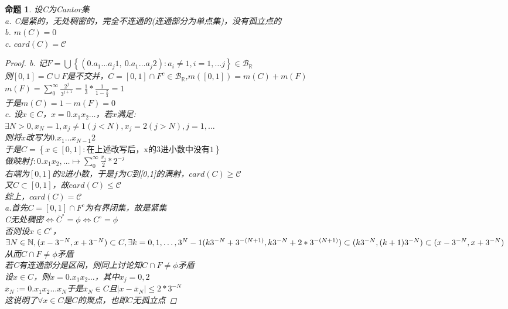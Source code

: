 \documentclass[12pt, a4paper, oneside]{ctexbook}
\newtheorem{proposition}[theorem]{命题}
\begin{document}
\begin{proposition}
    设C为Cantor集\\
    a. C是紧的，无处稠密的，完全不连通的(连通部分为单点集)，没有孤立点的\\
    b. $m(C)=0$\\
    c. $card(C)=\mathcal{C}$
    \begin{proof}
        b. 记$F=\bigcup\left\{(0.a_1\dots a_j1,\ 0.a_1\dots a_j2):a_i\neq 1,i=1,\dots j\right\}\in\mathcal{B}_{\mathbb{R}}$\\
        则$[0,1]=C\cup F$是不交并，$C=[0,1]\cap F^c\in\mathcal{B}_{\mathbb{R}}$,$m([0,1])=m(C)+m(F)$\\
        $m(F)=\sum_0^{\infty}\frac{2^j}{3^{j+1}}=\frac{1}{3}*\frac{1}{1-\frac{2}{3}}=1$\\
        于是$m(C)=1-m(F)=0$\\
        c. 设$x\in C$，$x=0.x_1x_2\dots$，若$x$满足:\\
        $\exists N>0,x_N=1,x_j\neq 1(j<N),x_j=2(j>N),j=1,\dots$\\
        则将$x$改写为$0.x_1\dots x_{N-1}2$\\
        于是$C=\left\{x\in[0,1]:\text{在上述改写后，x的3进小数中没有1}\right\}$\\
        做映射$f:0.x_1x_2,\dots\mapsto \sum_0^{\infty}\frac{x_j}{2}*2^{-j}$\\
        右端为$[0,1]$的2进小数，于是$f$为C到[0,1]的满射，$card(C)\geq \mathcal{C}$\\
        又$C\subset[0,1]$，故$card(C)\leq\mathcal{C}$\\
        综上，$card(C)=\mathcal{C}$\\
        a.首先$C=[0,1]\cap F^c$为有界闭集，故是紧集\\
        C无处稠密$\Leftrightarrow \overline{C}^{\circ}=\phi\Leftrightarrow C^{\circ}=\phi$\\
        否则设$x\in C^{\circ}$，$\exists N\in\mathbb{N},(x-3^{-N},x+3^{-N})\subset C,\exists k=0,1,\dots,3^N-1\\
        (k3^{-N}+3^{-(N+1)},k3^{-N}+2*3^{-(N+1)})\subset(k3^{-N},(k+1)3^{-N})\\
        \subset(x-3^{-N},x+3^{-N})$从而$C\cap F\neq\phi$矛盾\\
        若C有连通部分是区间，则同上讨论知$C\cap F\neq\phi$矛盾\\
        设$x\in C$，则$x=0.x_1x_2\dots$，其中$x_j=0,2$\\
        $\overline{x}_N:=0.x_1x_2\dots x_N$于是$\overline{x}_N\in C$且$|x-\overline{x}_N|\leq 2*3^{-N}$\\
        这说明了$\forall x\in C$是$C$的聚点，也即$C$无孤立点
    \end{proof}
\end{proposition}
\end{document}
